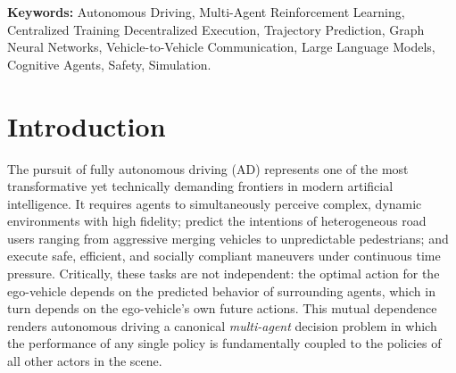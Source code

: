 \documentclass[12pt, a4paper]{article}
\begin{document}
\begin{abstract}
\textbf{Layer 3 / Paradigm III---Scalable and Cognitive Architectures ($\approx$2021--present).}
We survey the emerging paradigm that addresses interpretability and long-tail
coverage by importing architectural innovations from NLP: Multi-Agent
Transformers~\cite{wen2022multi} for global dependency modeling, and
LLM-based cognitive agents~\cite{fu2023drive,wen2023dilu,mao2023gpt,sha2023languagempc}
that supply commonsense reasoning, memory-augmented lifelong adaptation,
and neuro-symbolic integration with Model Predictive Control.
Safety frameworks~\cite{shalev2016safe,achiam2017constrained} and
simulation benchmarks (CARLA~\cite{dosovitskiy2017carlaopenurbandriving},
nuPlan~\cite{caesar2021nuplan}, Waymo~\cite{ettinger2021large}) are
examined as cross-cutting infrastructure.

A cross-cutting analysis synthesizes the persistent tensions across all three
paradigms: expressiveness vs.\ tractability in credit assignment, idealized
vs.\ realistic communication assumptions in CTDE, and specialization vs.\
generalization under distribution shift.  The survey closes with a structured
mapping of seven open challenges---including formal safety verification,
bandwidth-constrained V2X, real-time LLM inference, and long-tail simulation
coverage---to seven concrete future research directions.
\end{abstract}

\noindent\textbf{Keywords:} Autonomous Driving, Multi-Agent Reinforcement Learning,
Centralized Training Decentralized Execution, Trajectory Prediction, Graph Neural
Networks, Vehicle-to-Vehicle Communication, Large Language Models, Cognitive Agents,
Safety, Simulation.

\newpage
\tableofcontents
\newpage

\section{Introduction}
\label{sec:intro}

The pursuit of fully autonomous driving (AD) represents one of the most
transformative yet technically demanding frontiers in modern artificial
intelligence.  It requires agents to simultaneously perceive complex,
dynamic environments with high fidelity; predict the intentions of
heterogeneous road users ranging from aggressive merging vehicles to
unpredictable pedestrians; and execute safe, efficient, and socially
compliant maneuvers under continuous time pressure.  Critically, these
tasks are not independent: the optimal action for the ego-vehicle depends
on the predicted behavior of surrounding agents, which in turn depends on
the ego-vehicle's own future actions.  This mutual dependence renders
autonomous driving a canonical \emph{multi-agent} decision problem in
which the performance of any single policy is fundamentally coupled to the
policies of all other actors in the scene.
\end{document}
